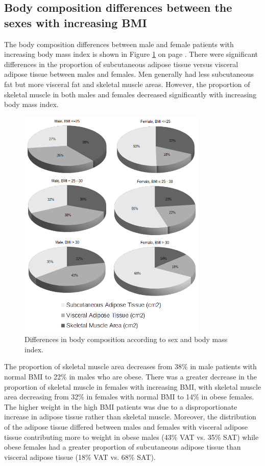 \subsection{Body composition differences between the sexes with increasing BMI}
The body composition differences between male and female patients with increasing body mass index is shown in Figure \ref{fig:bc_gender_bmi} on page \pageref{fig:bc_gender_bmi}. 
There were significant differences in the proportion of subcutaneous adipose tissue versus visceral adipose tissue between males and females. 
Men generally had less subcutaneous fat but more visceral fat and skeletal muscle areas. 
However, the proportion of skeletal muscle in both males and females decreased significantly with increasing body mass index.

\begin{figure}[h]
	\centering
	\includegraphics[width=0.8\textwidth]{Figures/bc_gender_bmi_pie}
	\caption{Differences in body composition according to sex and body mass index.}
	\label{fig:bc_gender_bmi}
\end{figure}

The proportion of skeletal muscle area decreases from 38\% in male patients with normal BMI to 22\% in males who are obese. 
There was a greater decrease in the proportion of skeletal muscle in females with increasing BMI, with skeletal muscle area decreasing from 32\% in females with normal BMI to 14\% in obese females. 
The higher weight in the high BMI patients was due to a disproportionate increase in adipose tissue rather than skeletal muscle. 
Moreover, the distribution of the adipose tissue differed between males and females with visceral adipose tissue contributing more to weight in obese males (43\% VAT vs. 35\% SAT) while obese females had a greater proportion of subcutaneous adipose tissue than visceral adipose tissue (18\% VAT vs. 68\% SAT).

